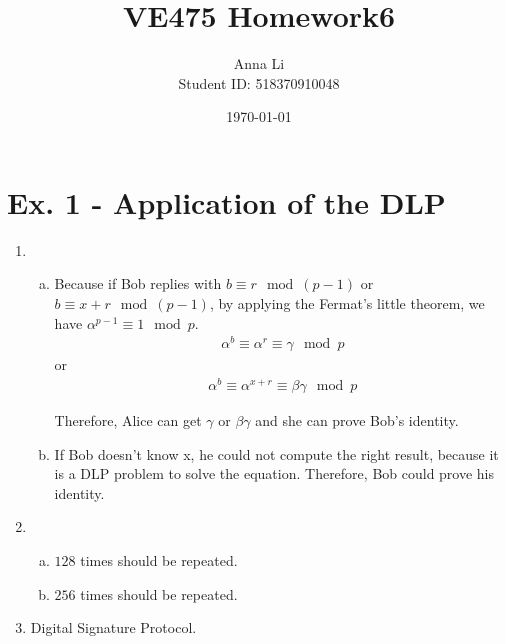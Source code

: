 \documentclass[a4paper,12pt]{journal}
\title{VE475 Homework6}
\author{Anna Li \\Student ID: 518370910048}
\date{\today}
\begin{document}
	\maketitle
\section*{Ex. 1 - Application of the DLP}
\begin{enumerate}
	\item \begin{enumerate}[a)]
		\item Because if Bob replies with $b \equiv r \mod (p-1)$ or $b \equiv x + r \mod (p-1)$, by applying the Fermat's little theorem, we have $\alpha^{p-1} \equiv 1 \mod p$.
		\begin{align*}
			\alpha^{b} \equiv \alpha^{r} \equiv \gamma \mod p
		\end{align*}
		or
		\begin{align*}
			\alpha^{b} \equiv \alpha^{x+r} \equiv \beta\gamma \mod p
		\end{align*}
		\par Therefore, Alice can get $\gamma$ or $\beta\gamma$  and  she can prove Bob's identity.
		
		\item If Bob doesn't know x, he could not compute the right result, because it is a DLP problem to solve the equation. Therefore, Bob could prove his identity.
	\end{enumerate}
	
	\item \begin{enumerate}[a)]
		\item $128$ times should be repeated.
		
		\item $256$ times should be repeated.
	\end{enumerate}
	
	\item  Digital Signature Protocol.
\end{enumerate}
\end{document}
